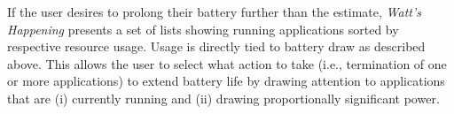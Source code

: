 If the user desires to prolong their battery further than the estimate, \emph{Watt's Happening} presents a set of lists showing running applications sorted by respective resource usage.
Usage is directly tied to battery draw as described above. 
This allows the user to select what action to take (i.e., termination of one or more applications) to extend battery life by drawing attention to applications that are (i) currently running and (ii) drawing proportionally significant power.





